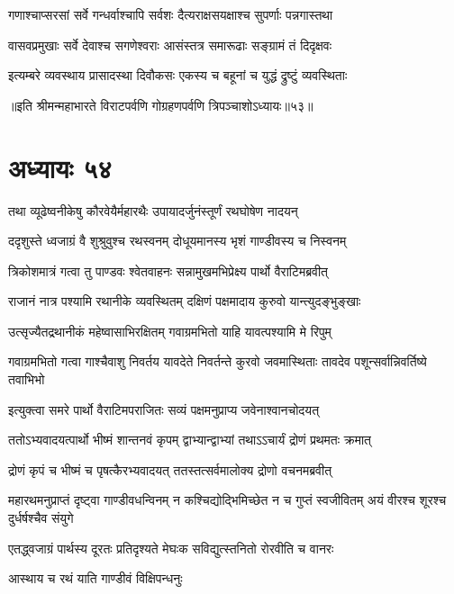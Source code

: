 \twolineshloka
{गणाश्चाप्सरसां सर्वे गन्धर्वाश्चापि सर्वशः}
{दैत्यराक्षसयक्षाश्च सुपर्णाः पन्नगास्तथा}


\twolineshloka
{वासवप्रमुखाः सर्वे देवाश्च सगणेश्वराः}
{आसंस्तत्र समारूढाः सङ्ग्रामं तं दिदृक्षवः}


\twolineshloka
{इत्यम्बरे व्यवस्थाय प्रासादस्था दिवौकसः}
{एकस्य च बहूनां च युद्धं द्रुष्टुं व्यवस्थिताः}

॥इति श्रीमन्महाभारते विराटपर्वणि गोग्रहणपर्वणि त्रिपञ्चाशोऽध्यायः॥५३॥

\chapter{अध्यायः ५४}

\twolineshloka
{तथा व्यूढेष्वनीकेषु कौरवेयैर्महारथैः}
{उपायादर्जुनंस्तूर्णं रथघोषेण नादयन्}


\twolineshloka
{ददृशुस्ते ध्वजाग्रं वै शुश्रुवुश्च रथस्वनम्}
{दोधूयमानस्य भृशं गाण्डीवस्य च निस्वनम्}


\twolineshloka
{त्रिकोशमात्रं गत्वा तु पाण्डवः श्वेतवाहनः}
{सन्नामुखमभिप्रेक्ष्य पार्थो वैराटिमब्रवीत्}


\twolineshloka
{राजानं नात्र पश्यामि रथानीके व्यवस्थितम्}
{दक्षिणं पक्षमादाय कुरुवो यान्त्युदङ्भुङ्खाः}


\twolineshloka
{उत्सृज्यैतद्रथानीकं महेष्वासाभिरक्षितम्}
{गवाग्रमभितो याहि यावत्पश्यामि मे रिपुम्}


\threelineshloka
{गवाग्रमभितो गत्वा गाश्चैवाशु निवर्तय}
{यावदेते निवर्तन्ते कुरवो जवमास्थिताः}
{तावदेव पशून्सर्वान्निवर्तिष्ये तवाभिभो}



\twolineshloka
{इत्युक्त्वा समरे पार्थो वैराटिमपराजितः}
{सव्यं पक्षमनुप्राप्य जवेनाश्वानचोदयत्}


\twolineshloka
{ततोऽभ्यवादयत्पार्थो भीष्मं शान्तनवं कृपम्}
{द्वाभ्यान्द्वाभ्यां तथाऽऽचार्यं द्रोणं प्रथमतः क्रमात्}


\twolineshloka
{द्रोणं कृपं च भीष्मं च पृषत्कैरभ्यवादयत्}
{ततस्तत्सर्वमालोक्य द्रोणो वचनमब्रवीत्}


\threelineshloka
{महारथमनुप्राप्तं दृष्ट्वा गाण्डीवधन्विनम्}
{न कश्चिद्योद्भिमिच्छेत न च गुप्तं स्वजीवितम्}
{अयं वीरश्च शूरश्च दुर्धर्षश्चैव संयुगे}


\twolineshloka
{एतद्ध्वजाग्रं पार्थस्य दूरतः प्रतिदृश्यते}
{मेघःक सविद्युत्स्तनितो रोरवीति च वानरः}


\onelineshloka
{आस्थाय च रथं याति गाण्डीवं विक्षिपन्धनुः}


